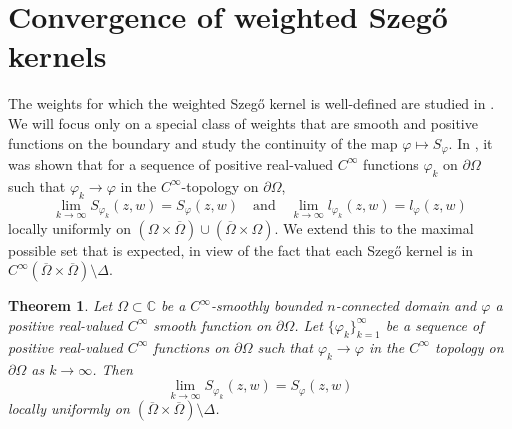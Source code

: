 \documentclass[11pt, reqno]{amsart}
\newtheorem{thm}{Theorem}[section]
\numberwithin{equation}{section}
\newcommand{\Om}{\Omega}
\begin{document}
	\section{Convergence of weighted Szeg\H{o} kernels}

    The weights for which the weighted Szeg\H{o} kernel is well-defined are studied in \cite{pw-um}. We will focus only on a special class of weights that are smooth and positive functions on the boundary and study the continuity of the map $\varphi \mapsto S_{\varphi}$. In \cite{JV}, it was shown that for a sequence of positive real-valued $C^{\infty}$ functions $\varphi_k$ on $\partial\Omega$ such that $\varphi_k\rightarrow\varphi$ in the $C^{\infty}$-topology on $\partial\Omega$,  
		\begin{equation}
		\lim_{k\rightarrow\infty}S_{\varphi_k}(z,w) = S_{\varphi}(z,w)
		\quad
		\text{and}
		\quad
		\lim_{k\rightarrow\infty}l_{\varphi_k}(z,w) = l_{\varphi}(z,w)
		\end{equation}
		locally uniformly on $(\Omega\times\overline{\Omega})\cup(\overline{\Omega}\times\Omega)$. We extend this to the maximal possible set that is expected, in view of the fact that each Szeg\H{o} kernel is in $C^{\infty} (\overline{\Omega}\times\overline{\Omega}) \setminus \Delta$.   

	\begin{thm}\label{Szego}
		Let $\Omega\subset\mathbb{C}$ be a $C^{\infty}$-smoothly bounded $n$-connected domain and $\varphi$ a positive real-valued $C^{\infty}$ smooth function on $\partial\Omega$. 
		Let $\{\varphi_k\}_{k=1}^{\infty}$ be a sequence of positive real-valued $C^{\infty}$ functions on $\partial\Omega$ such that $\varphi_k\rightarrow\varphi$ in the $C^{\infty}$ topology on $\partial\Omega$ as $k\rightarrow\infty$. Then
		\begin{equation}
		\lim_{k\rightarrow\infty}S_{\varphi_k}(z,w) = S_{\varphi}(z,w) 
		\end{equation}
		locally uniformly on $(\overline{\Om}\times\overline{\Om})\setminus \Delta$. 
	\end{thm}
	
\end{document}
